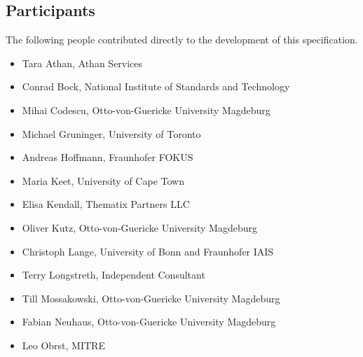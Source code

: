 \documentclass[10pt,fleqn,%
\ifpretendfinal
final%
\else
draft%
\fi,
]{scrreprt}
\begin{document}
\subsection{Participants}
The following people contributed directly to the development of this specification. 
	\begin{itemize}
	\item Tara Athan, Athan Services 
	\item Conrad Bock, National Institute of Standards and Technology  
	\item Mihai Codescu, Otto-von-Guericke University Magdeburg 
	\item Michael Gruninger, University of Toronto  
	\item Andreas Hoffmann, Fraunhofer FOKUS 
	\item Maria Keet, University of Cape Town 
	\item Elisa Kendall,  Thematix Partners LLC	
	\item Oliver Kutz, Otto-von-Guericke University Magdeburg  
	\item Christoph Lange, University of Bonn and Fraunhofer IAIS
	\item Terry Longstreth, Independent Consultant 	
	\item Till Mossakowski, Otto-von-Guericke University Magdeburg  	
	\item Fabian Neuhaus, Otto-von-Guericke University Magdeburg  
	\item Leo Obrst, MITRE  
	\end{itemize}
%	
\end{document}
